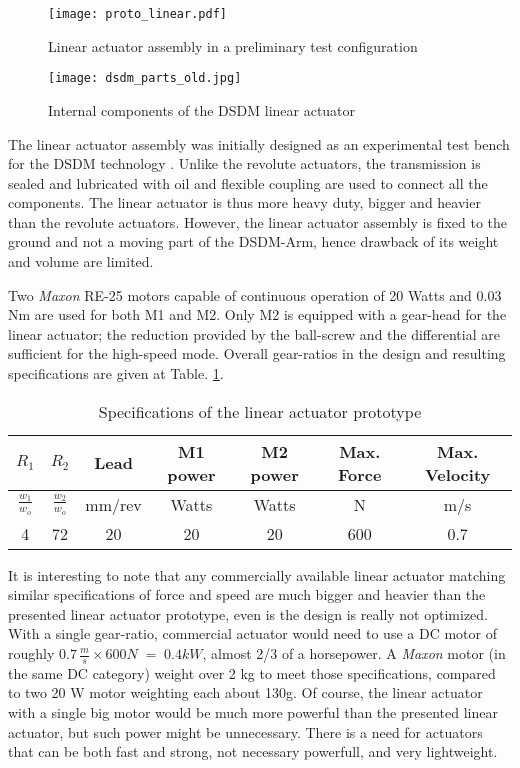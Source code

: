 \begin{figure}[htp]
	\centering
		\texttt{[image: proto\_linear.pdf]}
	\caption{Linear actuator assembly in a preliminary test configuration} 
	\label{fig:linact}
\end{figure}

\begin{figure}[htbp]
	\centering
		\texttt{[image: dsdm\_parts\_old.jpg]}
	\caption{Internal components of the DSDM linear actuator}
	\label{fig:dsdm_parts_old}
\end{figure}

The linear actuator assembly was initially designed as an experimental test bench for the DSDM technology \cite{girard_two-speed_2015}. Unlike the revolute actuators, the transmission is sealed and lubricated with oil and flexible coupling are used to connect all the components.  The linear actuator is thus more heavy duty, bigger and heavier than the revolute actuators. However, the linear actuator assembly is fixed to the ground and not a moving part of the DSDM-Arm, hence drawback of its weight and volume are limited. 

Two \textit{Maxon} RE-25 motors capable of continuous operation of 20 Watts and 0.03 Nm are used for both M1 and M2. Only M2 is equipped with a gear-head for the linear actuator; the reduction provided by the ball-screw and the differential are sufficient for the high-speed mode. Overall gear-ratios in the design and resulting specifications are given at Table. \ref{tab:specrev}.

\begin{table}[htbp]
	\centering
	\caption{Specifications of the linear actuator prototype}
		\begin{tabular}{ c c c c c c c }
			\hline
			$R_1$ & $R_2$ & Lead & M1 power & M2 power & Max. Force & Max. Velocity \\
			\hline
			$\frac{w_1}{w_o}$ & $\frac{w_2}{w_o}$ & mm/rev &Watts & Watts & N & m/s \\
			\hline \hline
			4 & 72 & 20 & 20 & 20 & 600 & 0.7 \\
			\hline
		\end{tabular}
	\label{tab:specrev}
\end{table}

It is interesting to note that any commercially available linear actuator matching similar specifications of force and speed are much bigger and heavier than the presented linear actuator prototype, even is the design is really not optimized. With a single gear-ratio, commercial actuator would need to use a DC motor of roughly $0.7 \, \frac{m}{s} \times 600 N \; = \; 0.4 kW $, almost 2/3 of a horsepower. A \textit{Maxon} motor (in the same DC category) weight over 2 kg to meet those specifications, compared to two 20 W motor weighting each about 130g. Of course, the linear actuator with a single big motor would be much more powerful than the presented linear actuator, but such power might be unnecessary. There is a need for actuators that can be both fast and strong, not necessary powerfull, and very lightweight. 


